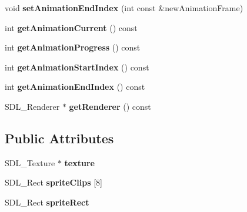 \begin{DoxyCompactItemize}
\item 
\hypertarget{class_sprite_a064d0e14144921c39451debf65962e38}{}void {\bfseries set\+Animation\+End\+Index} (int const \&new\+Animation\+Frame)\label{class_sprite_a064d0e14144921c39451debf65962e38}

\item 
\hypertarget{class_sprite_a45ec693b97cb6b47473c1f2de9cb53ed}{}int {\bfseries get\+Animation\+Current} () const \label{class_sprite_a45ec693b97cb6b47473c1f2de9cb53ed}

\item 
\hypertarget{class_sprite_ab62a139516184d4fb110eed77f3e8f83}{}int {\bfseries get\+Animation\+Progress} () const \label{class_sprite_ab62a139516184d4fb110eed77f3e8f83}

\item 
\hypertarget{class_sprite_a296fabe394ccef7082b7af187b06c96e}{}int {\bfseries get\+Animation\+Start\+Index} () const \label{class_sprite_a296fabe394ccef7082b7af187b06c96e}

\item 
\hypertarget{class_sprite_a1aae49d75fa10b382297a9d9d54a83e0}{}int {\bfseries get\+Animation\+End\+Index} () const \label{class_sprite_a1aae49d75fa10b382297a9d9d54a83e0}

\item 
\hypertarget{class_sprite_aaaadb46aa25f6eec1e6ee4b19540e835}{}S\+D\+L\+\_\+\+Renderer $\ast$ {\bfseries get\+Renderer} () const \label{class_sprite_aaaadb46aa25f6eec1e6ee4b19540e835}

\end{DoxyCompactItemize}
\subsection*{Public Attributes}
\begin{DoxyCompactItemize}
\item 
\hypertarget{class_sprite_a531ed274733d916261f49e1a2cbb6ba9}{}S\+D\+L\+\_\+\+Texture $\ast$ {\bfseries texture}\label{class_sprite_a531ed274733d916261f49e1a2cbb6ba9}

\item 
\hypertarget{class_sprite_ae10dc2e1909783c117cb9247d7484ee3}{}S\+D\+L\+\_\+\+Rect {\bfseries sprite\+Clips} \mbox{[}8\mbox{]}\label{class_sprite_ae10dc2e1909783c117cb9247d7484ee3}

\item 
\hypertarget{class_sprite_a8c0a36cf84c36b2882622d51f79914db}{}S\+D\+L\+\_\+\+Rect {\bfseries sprite\+Rect}\label{class_sprite_a8c0a36cf84c36b2882622d51f79914db}

\end{DoxyCompactItemize}



